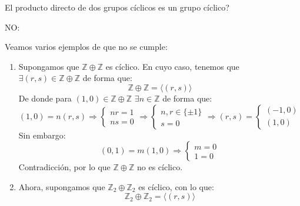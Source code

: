 El producto directo de dos grupos cíclicos es un grupo cíclico?

NO:

\begin{ejemplo}
    Veamos varios ejemplos de que no se cumple:
    \begin{enumerate}
        \item Supongamos que $\mathbb{Z}\oplus\mathbb{Z}$ es cíclico. En cuyo caso, tenemos que $\exists (r,s)\in \mathbb{Z}\oplus\mathbb{Z}$ de forma que:
            \begin{equation*}
                \mathbb{Z}\oplus\mathbb{Z} = \langle (r,s) \rangle 
            \end{equation*}
            De donde para $(1,0)\in \mathbb{Z}\oplus\mathbb{Z}$ $\exists n\in \mathbb{Z}$ de forma que:
            \begin{equation*}
                (1, 0) = n(r,s) \Longrightarrow \left\{\begin{array}{l}
                    nr = 1 \\
                    ns = 0
                \end{array}\right. \Longrightarrow \left\{\begin{array}{l}
                    n,r \in \{\pm 1\} \\
                    s = 0 
                \end{array}\right. \Longrightarrow (r,s) = \left\{\begin{array}{l}
                (-1, 0) \\
                (1, 0)
                \end{array}\right.
            \end{equation*}
            Sin embargo:
            \begin{equation*}
                (0,1) = m(1,0) \Longrightarrow \left\{\begin{array}{l}
                    m = 0 \\
                    1 = 0
                \end{array}\right.
            \end{equation*}
            Contradicción, por lo que $\mathbb{Z}\oplus \mathbb{Z}$ no es cíclico.
        \item Ahora, supongamos que $\mathbb{Z}_2\oplus\mathbb{Z}_2$ es cíclico, con lo que:
            \begin{equation*}
                \mathbb{Z}_2\oplus\mathbb{Z}_2 = \langle (r,s) \rangle 
            \end{equation*}

\end{enumerate}
\end{ejemplo}
